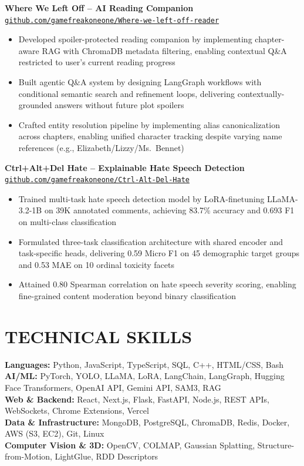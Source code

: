\documentclass[10pt,letterpaper]{article}
\begin{document}
\vspace{-2pt}

\textbf{Where We Left Off -- AI Reading Companion} \hfill \href{https://github.com/gamefreakoneone/Where-we-left-off-reader}{\texttt{github.com/gamefreakoneone/Where-we-left-off-reader}}
\begin{itemize}
    \item Developed spoiler-protected reading companion by implementing chapter-aware RAG with ChromaDB metadata filtering, enabling contextual Q\&A restricted to user's current reading progress
    \item Built agentic Q\&A system by designing LangGraph workflows with conditional semantic search and refinement loops, delivering contextually-grounded answers without future plot spoilers
    \item Crafted entity resolution pipeline by implementing alias canonicalization across chapters, enabling unified character tracking despite varying name references (e.g., Elizabeth/Lizzy/Ms.\ Bennet)
\end{itemize}

\vspace{-2pt}

\textbf{Ctrl+Alt+Del Hate -- Explainable Hate Speech Detection} \hfill \href{https://github.com/gamefreakoneone/Ctrl-Alt-Del-Hate}{\texttt{github.com/gamefreakoneone/Ctrl-Alt-Del-Hate}}
\begin{itemize}
    \item Trained multi-task hate speech detection model by LoRA-finetuning LLaMA-3.2-1B on 39K annotated comments, achieving 83.7\% accuracy and 0.693 F1 on multi-class classification
    \item Formulated three-task classification architecture with shared encoder and task-specific heads, delivering 0.59 Micro F1 on 45 demographic target groups and 0.53 MAE on 10 ordinal toxicity facets
    \item Attained 0.80 Spearman correlation on hate speech severity scoring, enabling fine-grained content moderation beyond binary classification
\end{itemize}

\vspace{-4pt}

\section*{TECHNICAL SKILLS}
\textbf{Languages:} Python, JavaScript, TypeScript, SQL, C++, HTML/CSS, Bash \\[2pt]
\textbf{AI/ML:} PyTorch, YOLO, LLaMA, LoRA, LangChain, LangGraph, Hugging Face Transformers, OpenAI API, Gemini API, SAM3, RAG \\[2pt]
\textbf{Web \& Backend:} React, Next.js, Flask, FastAPI, Node.js, REST APIs, WebSockets, Chrome Extensions, Vercel \\[2pt]
\textbf{Data \& Infrastructure:} MongoDB, PostgreSQL, ChromaDB, Redis, Docker, AWS (S3, EC2), Git, Linux \\[2pt]
\textbf{Computer Vision \& 3D:} OpenCV, COLMAP, Gaussian Splatting, Structure-from-Motion, LightGlue, RDD Descriptors
\end{document}
